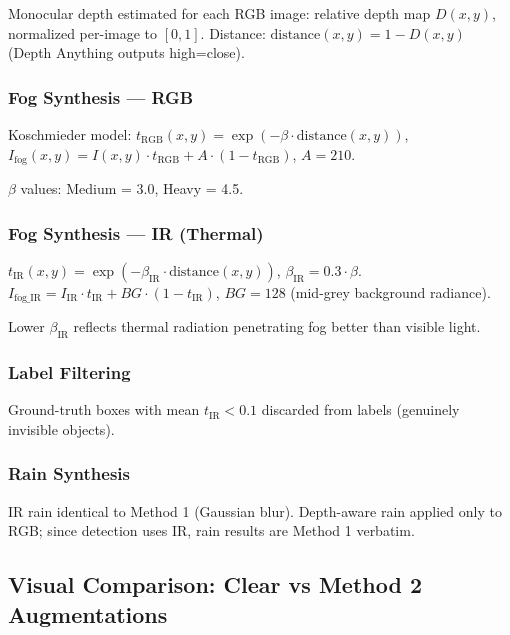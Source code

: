 \documentclass[11pt,a4paper]{article}
\begin{document}
Monocular depth estimated for each RGB image: relative depth map $D(x,y)$, normalized per-image to $[0, 1]$. Distance: $\text{distance}(x,y) = 1 - D(x,y)$ (Depth Anything outputs high=close).

\subsubsection{Fog Synthesis --- RGB}

Koschmieder model: $t_{\text{RGB}}(x,y) = \exp(-\beta \cdot \text{distance}(x,y))$, $I_{\text{fog}}(x,y) = I(x,y) \cdot t_{\text{RGB}} + A \cdot (1 - t_{\text{RGB}})$, $A = 210$.

$\beta$ values: Medium = 3.0, Heavy = 4.5.

\subsubsection{Fog Synthesis --- IR (Thermal)}

$t_{\text{IR}}(x,y) = \exp(-\beta_{\text{IR}} \cdot \text{distance}(x,y))$, $\beta_{\text{IR}} = 0.3 \cdot \beta$. $I_{\text{fog\_IR}} = I_{\text{IR}} \cdot t_{\text{IR}} + BG \cdot (1 - t_{\text{IR}})$, $BG = 128$ (mid-grey background radiance).

Lower $\beta_{\text{IR}}$ reflects thermal radiation penetrating fog better than visible light.

\subsubsection{Label Filtering}

Ground-truth boxes with mean $t_{\text{IR}} < 0.1$ discarded from labels (genuinely invisible objects).

\subsubsection{Rain Synthesis}

IR rain identical to Method 1 (Gaussian blur). Depth-aware rain applied only to RGB; since detection uses IR, rain results are Method 1 verbatim.

\subsection{Visual Comparison: Clear vs Method 2 Augmentations}
\end{document}
